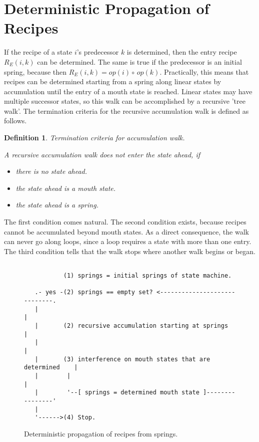 \documentclass[12pt,a4paper]{scrartcl}
\newtheorem{definition}{Definition}
\begin{document}
%
\section{Deterministic Propagation of Recipes}

If the recipe of a state $i$'s predecessor $k$ is determined, then the entry
recipe $R_E(i,k)$ can be determined. The same is true if the predecessor is an initial
spring, because then $R_E(i,k) = op(i)\circ\,op(k)$. Practically, this means
that recipes can be determined starting from a spring along linear states by
accumulation until the entry of a mouth state is reached. Linear states may
have multiple successor states, so this walk can be accomplished by a recursive
'tree walk'.  The termination criteria for the recursive accumulation walk is
defined as follows.

\begin{definition}
Termination criteria for accumulation walk.

A recursive accumulation walk does not enter the state ahead, if 

\begin{itemize}
    \item there is no state ahead.
    \item the state ahead is a mouth state.
    \item the state ahead is a spring.
\end{itemize}
\end{definition}

The first condition comes natural. The second condition exists, because recipes
cannot be accumulated beyond mouth states. As a direct consequence, the walk
can never go along loops, since a loop requires a state with more than one
entry. The third condition tells that the walk stops where another walk begins
or began.  

\begin{figure}[htbp] \leavevmode \label{fig:algo-1}
\begin{verbatim}
   
           (1) springs = initial springs of state machine.

   .- yes -(2) springs == empty set? <-----------------------------.
   |                                                               |
   |       (2) recursive accumulation starting at springs          |
   |                                                               |
   |       (3) interference on mouth states that are determined    |
   |        |                                                      |
   |        '--[ springs = determined mouth state ]----------------'
   |
   '------>(4) Stop.

\end{verbatim}

\caption{Deterministic propagation of recipes from springs.}
\end{figure}
\end{document}
